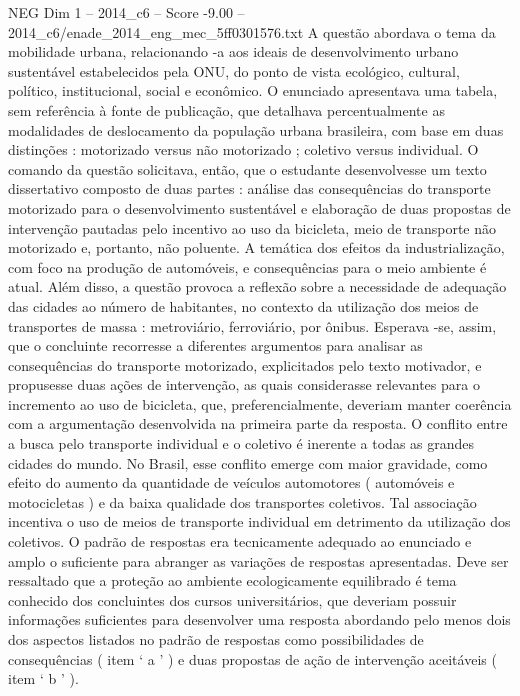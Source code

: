 \begin{textsample}{NEG Dim 1 – 2014\_c6 – Score -9.00 – 2014\_c6/enade\_2014\_eng\_mec\_5ff0301576.txt}
A questão abordava o tema da mobilidade urbana, relacionando -a aos ideais de desenvolvimento urbano sustentável estabelecidos pela ONU, do ponto de vista ecológico, cultural, político, institucional, social e econômico.
O enunciado apresentava uma tabela, sem referência à fonte de publicação, que detalhava percentualmente as modalidades de deslocamento da população urbana brasileira, com base em duas distinções : motorizado versus não motorizado ; coletivo versus individual.
O comando da questão solicitava, então, que o estudante desenvolvesse um texto dissertativo composto de duas partes : análise das consequências do transporte motorizado para o desenvolvimento sustentável e elaboração de duas propostas de intervenção pautadas pelo incentivo ao uso da bicicleta, meio de transporte não motorizado e, portanto, não poluente.
A temática dos efeitos da industrialização, com foco na produção de automóveis, e consequências para o meio ambiente é atual.
Além disso, a questão provoca a reflexão sobre a necessidade de adequação das cidades ao número de habitantes, no contexto da utilização dos meios de transportes de massa : metroviário, ferroviário, por ônibus.
Esperava -se, assim, que o concluinte recorresse a diferentes argumentos para analisar as consequências do transporte motorizado, explicitados pelo texto motivador, e propusesse duas ações de intervenção, as quais considerasse relevantes para o incremento ao uso de bicicleta, que, preferencialmente, deveriam manter coerência com a argumentação desenvolvida na primeira parte da resposta.
O conflito entre a busca pelo transporte individual e o coletivo é inerente a todas as grandes cidades do mundo.
No Brasil, esse conflito emerge com maior gravidade, como efeito do aumento da quantidade de veículos automotores ( automóveis e motocicletas ) e da baixa qualidade dos transportes coletivos.
Tal associação incentiva o uso de meios de transporte individual em detrimento da utilização dos coletivos.
O padrão de respostas era tecnicamente adequado ao enunciado e amplo o suficiente para abranger as variações de respostas apresentadas.
Deve ser ressaltado que a proteção ao ambiente ecologicamente equilibrado é tema conhecido dos concluintes dos cursos universitários, que deveriam possuir informações suficientes para desenvolver uma resposta abordando pelo menos dois dos aspectos listados no padrão de respostas como possibilidades de consequências ( item ‘ a ’ ) e duas propostas de ação de intervenção aceitáveis ( item ‘ b ’ ).

\end{textsample}
